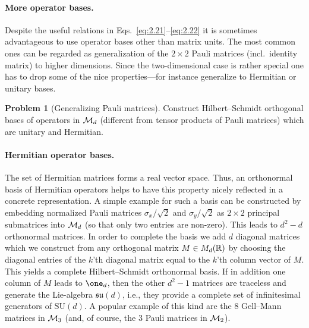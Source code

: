 \documentclass[11pt,a4paper]{article}
\numberwithin{equation}{section}
\theoremstyle{plain}
\theoremstyle{definition}
\newtheorem{problem}{Problem} %
\begin{document}
\paragraph{More operator bases.}
Despite the useful relations in Eqs.~\eqref{eq:2.21}--\eqref{eq:2.22} it is
sometimes advantageous to use operator bases other than matrix units. The most
common ones can be regarded as generalization of the $2\times 2$ Pauli matrices
(incl.\ identity matrix) to higher dimensions. Since the two-dimensional case is
rather special one has to drop some of the nice properties---for instance
generalize to Hermitian or unitary bases.

\begin{problem}[Generalizing Pauli matrices]
Construct Hilbert--Schmidt orthogonal bases of operators in $\mathcal{M}_d$ (different from
tensor products of Pauli matrices) which are unitary and Hermitian.
\end{problem}

\paragraph{Hermitian operator bases.}
The set of Hermitian matrices forms a real vector space. Thus, an orthonormal basis
of Hermitian operators helps to have this property nicely reflected in a concrete
representation. A simple example for such a basis can be constructed by embedding
normalized Pauli matrices $\sigma_x/\sqrt{2}$ and $\sigma_y/\sqrt{2}$ as $2\times 2$
principal submatrices into $\mathcal{M}_d$ (so that only two entries are non-zero). This
leads to $d^2-d$ orthonormal matrices. In order to complete the basis we add $d$
diagonal matrices which we construct from any orthogonal matrix $M\in M_d(\mathbb{R})$ by
choosing the diagonal entries of the $k$'th diagonal matrix equal to the $k$'th
column vector of $M$. This yields a complete Hilbert--Schmidt orthonormal basis. If
in addition one column of $M$ leads to $\one_d$, then the other $d^2-1$ matrices are
traceless and generate the Lie-algebra $\mathfrak{su}(d)$, i.e., they provide a
complete set of infinitesimal generators of $\mathrm{SU}(d)$. A popular example of
this kind are the $8$ Gell--Mann matrices in $\mathcal{M}_3$ (and, of course, the $3$ Pauli
matrices in $\mathcal{M}_2$).
\end{document}
